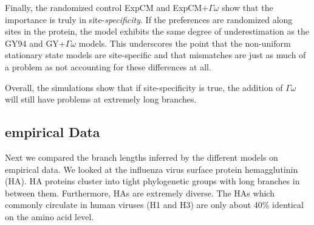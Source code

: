 \documentclass[11pt]{article}
\begin{document}
Finally, the randomized control ExpCM and ExpCM+$\Gamma\omega$ show that the importance is truly in site-\textit{specificity}. 
If the preferences are randomized along sites in the protein, the model exhibits the same degree of underestimation as the GY94 and GY+$\Gamma\omega$ models. 
This underscores the point that the non-uniform stationary state models are site-specific and that mismatches are just as much of a problem as not accounting for these differences at all. 

Overall, the simulations show that if site-specificity is true, the addition of $\Gamma\omega$ will still have problems at extremely long branches. 

\subsection*{empirical Data}

Next we compared the branch lengths inferred by the different models on empirical data. 
We looked at the influenza virus surface protein hemagglutinin (HA). 
HA proteins cluster into tight phylogenetic groups with long branches in between them. 
Furthermore, HAs are extremely diverse. 
The HAs which commonly circulate in human viruses (H1 and H3) are only about 40\% identical on the amino acid level. 
\end{document}
